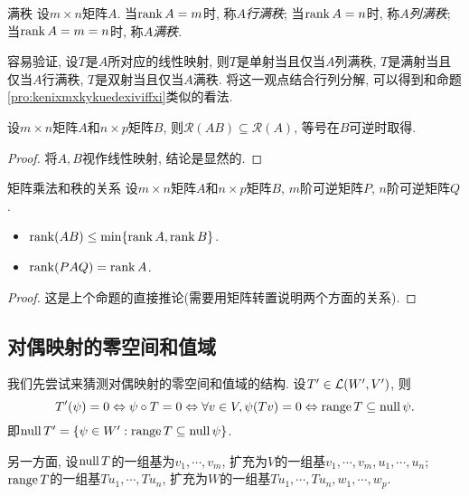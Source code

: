 \begin{definition}{满秩}
	设$m\times n$矩阵$A$. 当$\operatorname{rank} A = m$时, 称$A$\textit{行满秩}; 当$\operatorname{rank} A = n$时, 称$A$\textit{列满秩}; 当$\operatorname{rank} A = m =n$时, 称$A$\textit{满秩}. 
\end{definition}

容易验证, 设$T$是$A$所对应的线性映射, 则$T$是单射当且仅当$A$列满秩, $T$是满射当且仅当$A$行满秩, $T$是双射当且仅当$A$满秩. 将这一观点结合行列分解, 可以得到和命题\ref{pro:kenixmxkykuedexiviffxi}类似的看法. 

\begin{proposition}{}
	设$m\times n$矩阵$A$和$n\times p$矩阵$B$, 则$\mathcal{R}(AB) \subseteq \mathcal{R}(A)$, 等号在$B$可逆时取得. 
\end{proposition}
\begin{proof}
	将$A,B$视作线性映射, 结论是显然的. 
\end{proof}

\begin{proposition}{矩阵乘法和秩的关系}
	设$m\times n$矩阵$A$和$n\times p$矩阵$B$, $m$阶可逆矩阵$P$, $n$阶可逆矩阵$Q$. 
	\begin{itemize}
		\item $\operatorname{rank} (AB) \leq \min \{ \operatorname{rank} A,\operatorname{rank} B \}$. 
		\item $\operatorname{rank} (PAQ) = \operatorname{rank} A$. 
	\end{itemize}
\end{proposition}
\begin{proof}
	这是上个命题的直接推论(需要用矩阵转置说明两个方面的关系). 
\end{proof}

\subsection{对偶映射的零空间和值域}

我们先尝试来猜测对偶映射的零空间和值域的结构. 设$T' \in \mathcal{L} (W',V')$, 则
$$T'(\psi) = 0 \Leftrightarrow \psi \circ T = 0 \Leftrightarrow \forall v \in V,\psi (Tv)= 0 \Leftrightarrow \operatorname{range} T \subseteq \operatorname{null} \psi .$$
即$\operatorname{null} T' = \{ \psi \in W' : \operatorname{range} T \subseteq \operatorname{null} \psi \}$. 

另一方面, 设$\operatorname{null} T$的一组基为$v_1,\cdots ,v_m$, 扩充为$V$的一组基$v_1,\cdots ,v_m,u_1,\cdots ,u_n$; $\operatorname{range} T$的一组基$Tu_1,\cdots ,Tu_n$, 扩充为$W$的一组基$Tu_1,\cdots ,Tu_n,w_1,\cdots ,w_p$. 


